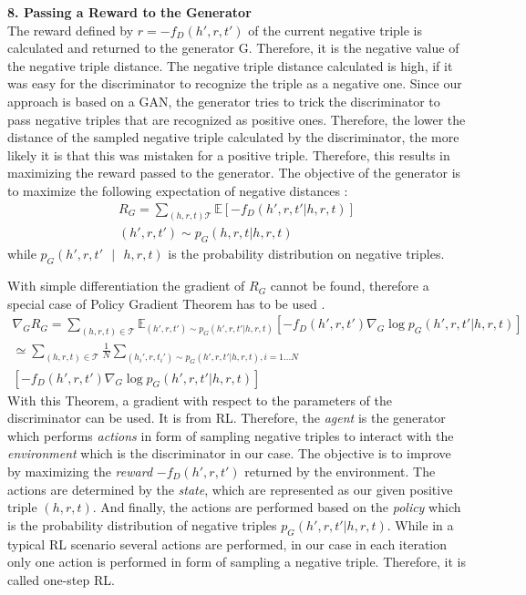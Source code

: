 \textbf{8. Passing a Reward to the Generator}\\
%
The reward defined by $r = - f_D(h',r,t')$ of the current negative triple is calculated and returned to the generator G.
Therefore, it is the negative value of the negative triple distance.
The negative triple distance calculated is high, if it was easy for the discriminator to recognize the triple as a negative one.
Since our approach is based on a \ac{GAN}, the generator tries to trick the discriminator to pass negative triples that are recognized as positive ones.
Therefore, the lower the distance of the sampled negative triple calculated by the discriminator, the more likely it is that this was mistaken for a positive triple.
Therefore, this results in maximizing the reward passed to the generator.
The objective of the generator is to maximize the following expectation of negative distances \cite{cai2017kbgan}:
\begin{multline}
    R_G = \sum_{(h,r,t) \mathcal{T}}{\mathbb{E}[-f_D(h',r,t'|h,r,t)]}\\
    (h',r,t') \sim p_G(h,r,t|h,r,t) 
\end{multline}
while $p_G(h', r, t'\text{ }|\text{ }h, r, t)$ is the probability distribution on negative triples.

With simple differentiation the gradient of $R_G$ cannot be found, therefore a special case of Policy Gradient Theorem has to be used \cite{cai2017kbgan}.
\begin{multline}
    \nabla_G R_G=\sum_{(h,r,t)\in\mathcal{T}}\mathbb{E}_{(h',r,t')\sim p_G(h',r,t'|h,r,t)}
    [-f_D(h',r,t')\nabla_G \log p_G(h',r,t'|h,r,t)] \\
    \simeq \sum_{(h,r,t)\in\mathcal{T}}\frac{1}{N}\sum_{(h_i',r,t_i')\sim p_G(h',r,t'|h,r,t), i=1\dots N} \\
    [-f_D(h',r,t')\nabla_G \log p_G(h',r,t'|h,r,t)]
\end{multline}
With this Theorem, a gradient with respect to the parameters of the discriminator can be used.
It is from \ac{RL}.
Therefore, the \textit{agent} is the generator which performs \textit{actions} in form of sampling negative triples to interact with the \textit{environment} which is the discriminator in our case.
The objective is to improve by maximizing the \textit{reward} $-f_D(h',r,t')$ returned by the environment.
The actions are determined by the \textit{state}, which are represented as our given positive triple $(h,r,t)$.
And finally, the actions are performed based on the \textit{policy} which is the probability distribution of negative triples $p_G(h',r,t'|h,r,t)$.
While in a typical \ac{RL} scenario several actions are performed, in our case in each iteration only one action is performed in form of sampling a negative triple.
Therefore, it is called one-step \ac{RL}.


